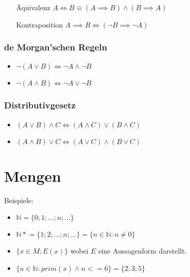 \documentclass[12pt]{scrreprt}
\begin{document}
                \begin{itemize}
                    \item[Äquivalenz] $ A \iff B \equiv (A \implies B) \land (B \implies A) $
                    \item[Kontraposition] $ A \implies B \iff (\lnot B \implies \lnot A) $
                \end{itemize}


                \subsubsection{de Morgan'schen Regeln}
                    \begin{itemize}
                        \item $ \lnot (A \lor B) \iff \lnot A \land \lnot B $
                        \item $ \lnot (A \land B) \iff \lnot A \lor \lnot B $
                    \end{itemize}


                \subsubsection{Distributivgesetz}
                    \begin{itemize}
                        \item $ (A \lor B) \land C \iff (A \land C) \lor (B \land C) $
                        \item $ (A \land B) \lor C \iff (A \lor C) \land (B \lor C) $
                    \end{itemize}



        \section{Mengen}
            Beispiele:
            \begin{itemize}
                \item $ \mathbb{N} = \{ 0; 1; ...; n; ... \} $
                \item $ \mathbb{N*} = \{ 1; 2; ...; n; ... \} = \{ n \in \mathbb{N} : n \neq 0 \} $
                \item $ \{ x \in M : E(x) \} $ wobei $ E $ eine Aussagenform darstellt.
                \item $ \{ n \in \mathbb{N} : prim(x) \land n <= 6 \} = \{ 2; 3; 5 \} $
            \end{itemize}
\end{document}
